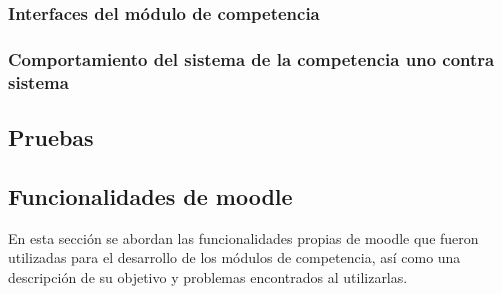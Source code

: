 \subsubsection{Interfaces del módulo de competencia}

    
    
    
    
    
    
    
    
    
    
    
    
    
    
    
    


    

\clearpage
\subsubsection{Comportamiento del sistema de la competencia uno contra sistema}
    

\subsection{Pruebas}




\subsection{Funcionalidades de moodle}

En esta sección se abordan las funcionalidades propias de moodle que fueron utilizadas para el desarrollo
de los módulos de competencia, así como una descripción de su objetivo y problemas encontrados al utilizarlas.\\

  
